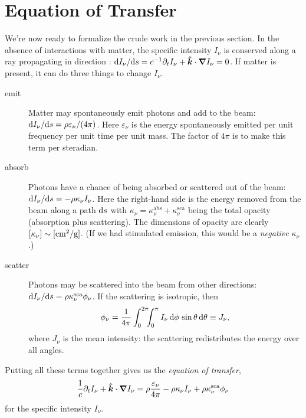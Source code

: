 \section{Equation of Transfer}

We're now ready to formalize the crude work in the previous section.
In the absence of interactions with matter, the specific intensity $I_{\nu}$ is conserved along a ray propagating in direction \unitk: $\mathrm{d} I_{\nu}/\mathrm{d} s = c^{-1}\partial_{t}I_{\nu} + \boldsymbol{\hat{k}}\cdot\boldsymbol{\nabla} I_{\nu} = 0$. If matter is present, it can do three things to change $I_{\nu}$.
\begin{description}
\item[emit] Matter may spontaneously emit photons and add to the beam: $\mathrm{d} I_{\nu}/\mathrm{d} s = \rho\varepsilon_{\nu}/(4\pi)$. Here $\varepsilon_{\nu}$ is the energy spontaneously emitted per unit frequency per unit time per unit mass.  The factor of $4\pi$ is to make this term per steradian.

\item[absorb] Photons have a chance of being absorbed or scattered out of the beam: $\mathrm{d} I_{\nu}/\mathrm{d} s = -\rho\kappa_{\nu}I_{\nu}$. Here the right-hand side is the energy removed from the beam along a path $\mathrm{d} s$ with $\kappa_{\nu} = \kappa_{\nu}^{\mathrm{abs}} + \kappa_{\nu}^{\mathrm{sca}}$ being the total opacity (absorption plus scattering). The dimensions of opacity are clearly $[\kappa_{\nu}] \sim [\mathrm{c}\mathrm{m}^{2}/\mathrm{g}]$. (If we had stimulated emission, this would be a \emph{negative} $\kappa_{\nu}$.)

\item[scatter] Photons may be scattered into the beam from other directions: $\mathrm{d} I_{\nu}/\mathrm{d} s = \rho\kappa_{\nu}^{\mathrm{sca}}\phi_{\nu}$. If the scattering is isotropic, then
\begin{equation}\label{e.isosca}
\phi_{\nu} = \frac{1}{4\pi}\int_{0}^{2\pi}\!\!\!\int_{0}^{\pi} I_{\nu}\,\mathrm{d}\phi\,\sin\theta\,\mathrm{d}\theta \equiv J_{\nu},
\end{equation}
where $J_{\nu}$ is the mean intensity: the scattering redistributes the energy over all angles.
\end{description}
Putting all these terms together gives us the \emph{equation of transfer},
\begin{equation}\label{e.transfer}
\frac{1}{c}\partial_{t}I_{\nu} + \boldsymbol{\hat{k}}\cdot\boldsymbol{\nabla} I_{\nu} = \rho \frac{\varepsilon_{\nu}}{4\pi} - \rho\kappa_{\nu} I_{\nu} + \rho\kappa_{\nu}^{\mathrm{sca}}\phi_{\nu}
\end{equation}
for the specific intensity $I_{\nu}$.


